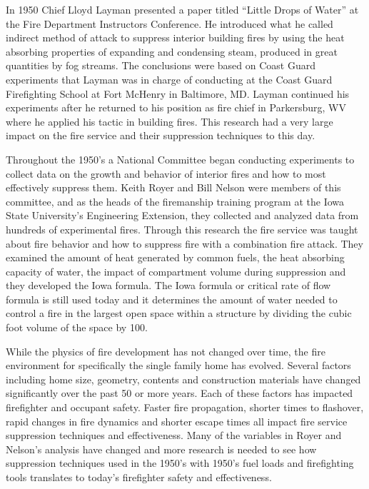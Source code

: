 \documentclass{article}
\begin{document}
In 1950 Chief Lloyd Layman presented a paper titled “Little Drops of Water” at the Fire Department Instructors Conference. He introduced what he called indirect method of attack to suppress interior building fires by using the heat absorbing properties of expanding and condensing steam, produced in great quantities by fog streams. The conclusions were based on Coast Guard experiments that Layman was in charge of conducting at the Coast Guard Firefighting School at Fort McHenry in Baltimore, MD. Layman continued his experiments after he returned to his position as fire chief in Parkersburg, WV where he applied his tactic in building fires.  This research had a very large impact on the fire service and their suppression techniques to this day. 

Throughout the 1950’s a National Committee began conducting experiments to collect data on the growth and behavior of interior fires and how to most effectively suppress them. Keith Royer and Bill Nelson were members of this committee, and as the heads of the firemanship training program at the Iowa State University’s Engineering Extension, they collected and analyzed data from hundreds of experimental fires. Through this research the fire service was taught about fire behavior and how to suppress fire with a combination fire attack. They examined the amount of heat generated by common fuels, the heat absorbing capacity of water, the impact of compartment volume during suppression and they developed the Iowa formula. The Iowa formula or critical rate of flow formula is still used today and it determines the amount of water needed to control a fire in the largest open space within a structure by dividing the cubic foot volume of the space by 100.

While the physics of fire development has not changed over time, the fire environment for specifically the single family home has evolved. Several factors including home size, geometry, contents and construction materials have changed significantly over the past 50 or more years. Each of these factors has impacted firefighter and occupant safety. Faster fire propagation, shorter times to flashover, rapid changes in fire dynamics and shorter escape times all impact fire service suppression techniques and effectiveness. Many of the variables in Royer and Nelson’s analysis have changed and more research is needed to see how suppression techniques used in the 1950’s with 1950’s fuel loads and firefighting tools translates to today’s firefighter safety and effectiveness.
\end{document}
